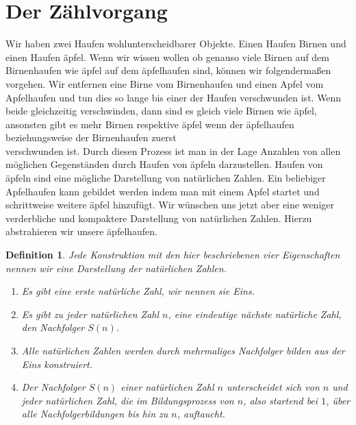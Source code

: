 \documentclass[11pt,a4paper,leqno]{report}
\newtheorem{definition}[theorem]{Definition}
\numberwithin{equation}{chapter}
\begin{document}
\section{Der Z\"ahlvorgang} Wir haben zwei Haufen wohlunterscheidbarer Objekte. Einen Haufen Birnen und einen Haufen \"apfel. Wenn wir wissen wollen ob genauso viele Birnen auf dem Birnenhaufen wie \"apfel auf dem \"apfelhaufen sind, k\"onnen wir folgenderma\ss{}en vorgehen. Wir entfernen eine Birne vom Birnenhaufen und einen Apfel vom Apfelhaufen und tun dies so lange bis einer der Haufen verschwunden ist. Wenn beide gleichzeitig verschwinden, dann sind es gleich viele Birnen wie \"apfel, ansonsten gibt es mehr Birnen respektive \"apfel wenn der \"apfelhaufen beziehungsweise der Birnenhaufen zuerst \\verschwunden ist. Durch diesen Prozess ist man in der Lage Anzahlen von allen m\"oglichen Gegenst\"anden durch Haufen von \"apfeln darzustellen. Haufen von \"apfeln sind eine m\"ogliche Darstellung von nat\"urlichen Zahlen. Ein beliebiger Apfelhaufen kann gebildet werden indem man mit einem Apfel startet und schrittweise weitere \"apfel hinzuf\"ugt. Wir w\"unschen uns jetzt aber eine weniger verderbliche und kompaktere Darstellung von nat\"urlichen Zahlen. Hierzu abstrahieren wir unsere \"apfelhaufen. 
\begin{definition} Jede Konstruktion mit den hier beschriebenen vier Eigenschaften nennen wir eine Darstellung der nat\"urlichen Zahlen.
	\begin{enumerate}
		\item Es gibt eine erste nat\"urliche Zahl, wir nennen sie Eins.
		\item Es gibt zu jeder nat\"urlichen Zahl $n$, eine eindeutige n\"achste nat\"urliche Zahl, den Nachfolger $S(n)$.
		\item Alle nat\"urlichen Zahlen werden durch mehrmaliges Nachfolger bilden aus der Eins konstruiert.
		\item Der Nachfolger $S(n)$ einer nat\"urlichen Zahl $n$ unterscheidet sich von $n$ und jeder nat\"urlichen Zahl, die im Bildungsprozess von $n$, also startend bei $1$, \"uber alle Nachfolgerbildungen bis hin zu $n$, auftaucht.
	\end{enumerate}
\end{definition}
\end{document}
